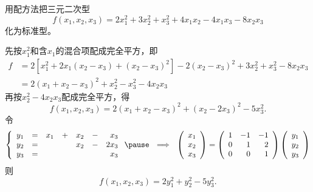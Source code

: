 \begin{frame}
  
    \begin{li}
      用配方法把三元二次型
      $$
      f(x_1,x_2,x_3)=2x_1^2+3x_2^2+x_3^2+4x_1x_2-4x_1x_3-8x_2x_3
      $$
      化为标准型。
    \end{li}
    \begin{jie}
    先按$x_1^2$和含$x_1$的混合项配成完全平方，即
    $$
    \begin{array}{rl}
      f&=2[x_1^2+2x_1(x_2-x_3)+(x_2-x_3)^2]-2(x_2-x_3)^2+3x_2^2+x_3^2-8x_2x_3\\[0.1in]
      &=2(x_1+x_2-x_3)^2+x_2^2-x_3^2-4x_2x_3
    \end{array}
    $$\pause
    再按$x_2^2-4x_2x_3$配成完全平方，得
    $$
    f(x_1,x_2,x_3)=2(x_1+x_2-x_3)^2+(x_2-2x_3)^2-5x_3^2.
    $$
    \pause
    令
    $$
    \left\{
    \begin{array}{rcrcrcr}
      y_1&=&x_1&+&x_2&-&x_3\\
      y_2&=& &&x_2&-&2x_3\\
      y_3&=&&&&&x_3
    \end{array}
    \right. \pause ~~\Longrightarrow~~
    \left(
    \begin{array}{c}
      x_1\\
      x_2\\
      x_3
    \end{array}
    \right)=
    \left(
    \begin{array}{rrr}
      1&-1&-1\\
      0&1&2\\
      0&0&1
    \end{array}
    \right)
    \left(
    \begin{array}{c}
      y_1\\
      y_2\\
      y_3
    \end{array}
    \right)
    $$ \pause 
    则
    $$
    f(x_1,x_2,x_3)=2y_1^2+y_2^2-5y_3^2.
    $$

    \end{jie}
  
\end{frame}


